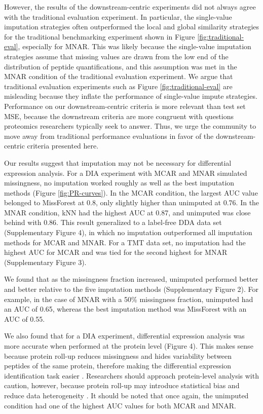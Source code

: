 \documentclass{article}
\begin{document}
However, the results of the downstream-centric experiments did not always agree with the traditional evaluation experiment. In particular, the single-value imputation strategies often outperformed the local and global similarity strategies for the traditional benchmarking experiment shown in Figure \ref{fig:traditional-eval}, especially for MNAR. This was likely because the single-value imputation strategies assume that missing values are drawn from the low end of the distribution of peptide quantifications, and this assumption was met in the MNAR condition of the traditional evaluation experiment. We argue that traditional evaluation experiments such as Figure \ref{fig:traditional-eval} are misleading because they inflate the performance of single-value impute strategies. Performance on our downstream-centric criteria is more relevant than test set MSE, because the downstream criteria are more congruent with questions proteomics researchers typically seek to answer. Thus, we urge the community to move away from traditional performance evaluations in favor of the downstream-centric criteria presented here.

Our results suggest that imputation may not be necessary for differential expression analysis. For a DIA experiment with MCAR and MNAR simulated missingness, no imputation worked roughly as well as the best imputation methods (Figure \ref{fig:PR-curves}). In the MCAR condition, the largest AUC value belonged to MissForest at 0.8, only slightly higher than unimputed at 0.76. In the MNAR condition, kNN had the highest AUC at 0.87, and unimputed was close behind with 0.86. This result generalized to a label-free DDA data set (Supplementary Figure 4), in which no imputation outperformed all imputation methods for MCAR and MNAR. For a TMT data set, no imputation had the highest AUC for MCAR and was tied for the second highest for MNAR (Supplementary Figure 3).

We found that as the missingness fraction increased, unimputed performed better and better relative to the five imputation methods (Supplementary Figure 2). For example, in the case of MNAR with a 50\% missingness fraction, unimputed had an AUC of 0.65, whereas the best imputation method was MissForest with an AUC of 0.55. 

We also found that for a DIA experiment, differential expression analysis was more accurate when performed at the protein level (Figure 4). This makes sense because protein roll-up reduces missingness and hides variability between peptides of the same protein, therefore making the differential expression identification task easier \cite{humpty-dumpty}.
Researchers should approach protein-level analysis with caution, however, because protein roll-up may introduce statistical bias and reduce data heterogeneity \cite{humpty-dumpty, boekweg-2023}. It should be noted that once again, the unimputed condition had one of the highest AUC values for both MCAR and MNAR.
\end{document}
